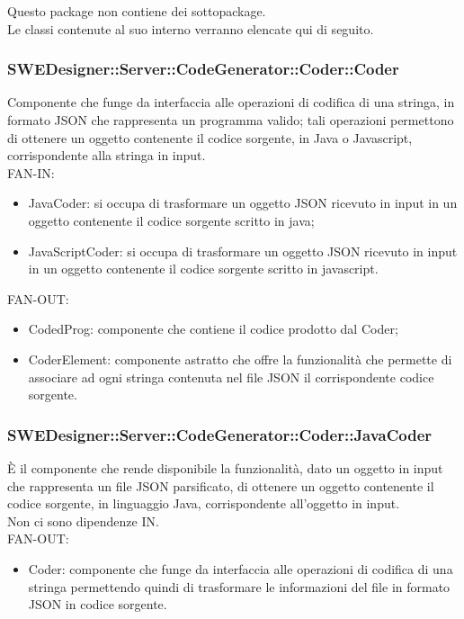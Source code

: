 \documentclass[../DefinizioneDiProdotto.tex]{subfiles}
\begin{document}
				Questo package non contiene dei sottopackage.\\
				Le classi contenute al suo interno verranno elencate qui di seguito.
				\subsubsection{SWEDesigner::Server::CodeGenerator::Coder::Coder}
				Componente che funge da interfaccia alle operazioni di codifica di una stringa, in formato JSON che rappresenta un programma valido; tali operazioni permettono di ottenere un oggetto contenente il codice sorgente, in Java o Javascript, corrispondente alla stringa in input.\\
					FAN-IN:
					\begin{itemize}
						\item JavaCoder: si occupa di trasformare un oggetto JSON ricevuto in input in un oggetto contenente il codice sorgente scritto in java;
						\item JavaScriptCoder: si occupa di trasformare un oggetto JSON ricevuto in input in un oggetto contenente il codice sorgente scritto in javascript.
					\end{itemize}
					FAN-OUT:
					\begin{itemize}
						\item CodedProg: componente che contiene il codice prodotto dal Coder;
						\item CoderElement: componente astratto che offre la funzionalità che permette di associare ad ogni stringa contenuta nel file JSON il corrispondente codice sorgente.
					\end{itemize}

				\subsubsection{SWEDesigner::Server::CodeGenerator::Coder::JavaCoder}
				È il componente che rende disponibile la funzionalità, dato un oggetto in input che rappresenta un file JSON parsificato, di ottenere un oggetto contenente il codice sorgente, in linguaggio Java, corrispondente all'oggetto in input.\\
					Non ci sono dipendenze IN.\\
					FAN-OUT:
					\begin{itemize}
						\item Coder: componente che funge da interfaccia alle operazioni di codifica di una stringa permettendo quindi di trasformare le informazioni del file in formato JSON in codice sorgente.
					\end{itemize}
\end{document}
